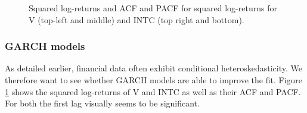 
\begin{figure}[h]
    \centering
    \begin{adjustbox}{width=.95\textwidth,center}
    
    
    \end{adjustbox}
    \hspace{3ex}
    \begin{adjustbox}{width=.95\textwidth,center}
    
    \end{adjustbox}
    \begin{adjustbox}{width=.95\textwidth,center}
    
    \end{adjustbox}
    \caption{Squared log-returns and ACF and PACF for squared log-returns for V (top-left and middle) and INTC (top right and bottom).}
    \label{fig:V_INTC_squared}
\end{figure}


\subsubsection{GARCH models}
As detailed earlier, financial data often exhibit conditional heteroskedasticity. We therefore want to see whether GARCH models are able to improve the fit. Figure \ref{fig:V_INTC_squared} shows the squared log-returns of V and INTC as well as their ACF and PACF. For both the first lag visually seems to be significant. 

